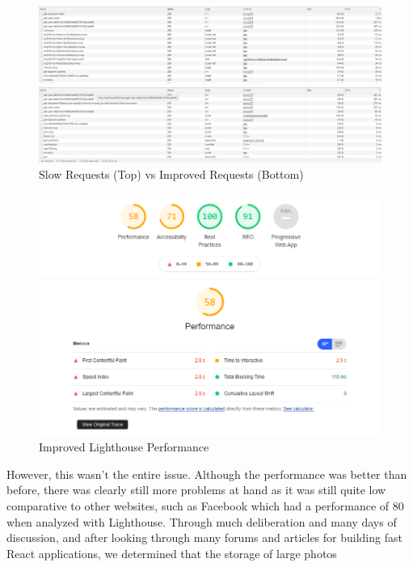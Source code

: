 \begin{figure}[H]
  \centering
  \includegraphics[scale=0.4]{img/slow_network_times.jpg}
  
  \newline
  
  \includegraphics[scale=0.4]{img/improved_network_times.jpg}
  \caption{Slow Requests (Top) vs Improved Requests (Bottom)}
  \label{fig:slow_network}
\end{figure}

\begin{figure}[H]
  \centering
  \includegraphics[scale=0.65]{img/improved_lighthouse.jpg}
  \caption{Improved Lighthouse Performance}
  \label{fig:improved_lighthouse}
\end{figure}

\newline

However, this wasn't the entire issue. Although the performance was better than before, there was clearly still more problems at hand as it was still quite low comparative to other websites, such as Facebook which had a performance of 80 when analyzed with Lighthouse. Through much deliberation and many days of discussion, and after looking through many forums and articles for building fast React applications, we determined that the storage of large photos 

